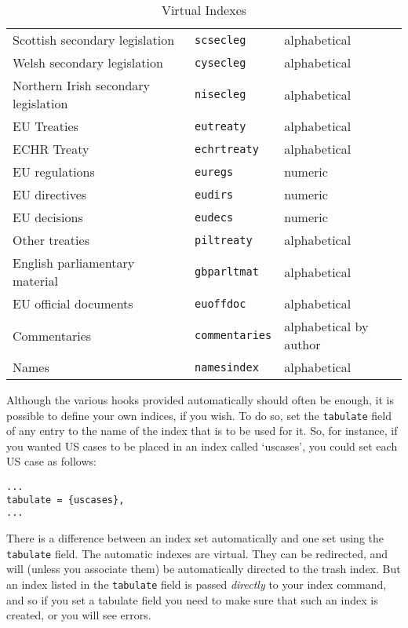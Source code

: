 \documentclass[a4paper,
               11pt,
	       DIV=1,			   
	       footinclude=false]
	      {scrartcl}
\newcounter{egcounter}\setcounter{egcounter}{0}
\newlength{\boxwidth}
\newenvironment{bibexample}[1][]
{%
  \medskip\par\noindent\ignorespaces
  \marginpar{[\refstepcounter{egcounter}\arabic{egcounter}]\label{#1}}%
  \setlength{\boxwidth}{0.95\linewidth}%
  \addtolength{\boxwidth}{-2\fboxsep}
  \addtolength{\boxwidth}{-2\fboxrule}
  \begin{lrbox}{\boxcontainer}
  \begin{minipage}[t]{\boxwidth}%
}
{%
  \end{minipage}\end{lrbox}%
  \colorbox{gray!30}{\usebox{\boxcontainer}}
  \par\medskip}
\begin{document}
\begin{table}
\begin{tabular}{lll}
Scottish secondary legislation       & \texttt{scsecleg}     & alphabetical \\
Welsh secondary legislation          & \texttt{cysecleg}     & alphabetical \\
Northern Irish secondary legislation & \texttt{nisecleg}     & alphabetical \\
EU Treaties                          & \texttt{eutreaty}     & alphabetical \\
ECHR Treaty                          & \texttt{echrtreaty}   & alphabetical \\
EU regulations                       & \texttt{euregs}       & numeric \\
EU directives                        & \texttt{eudirs}       & numeric \\
EU decisions                         & \texttt{eudecs}       & numeric \\
Other treaties                       & \texttt{piltreaty}    & alphabetical \\
English parliamentary material       & \texttt{gbparltmat}   & alphabetical \\
EU official documents                & \texttt{euoffdoc}     & alphabetical \\
Commentaries                         & \texttt{commentaries} & alphabetical 
                                                               by author \\
Names                                & \texttt{namesindex}   & alphabetical\\
\bottomrule
\end{tabular}
\caption{Virtual Indexes\label{categories}}
\end{table}

Although\label{tabulate} the various hooks provided automatically
should often be enough, it is possible to define your own indices, if you
wish. To do so, set the \texttt{tabulate} field of any entry to the
name of the index that is to be used for it. So, for instance, if you
wanted US cases to be placed in an index called `uscases', you could
set each US case as follows:
\begin{bibexample}[tabulation]
\begin{verbatim}
...
tabulate = {uscases},
...
\end{verbatim}
\end{bibexample}
There is a difference between an index set automatically and one set
using the \verb|tabulate| field. The automatic indexes are
virtual. They can be redirected, and will (unless you associate them)
be automatically directed to the trash index. But an index listed in
the \verb|tabulate| field is passed \emph{directly} to your index
command, and so if you set a tabulate field you need to make sure that
such an index is created, or you will see
errors.
\end{document}
